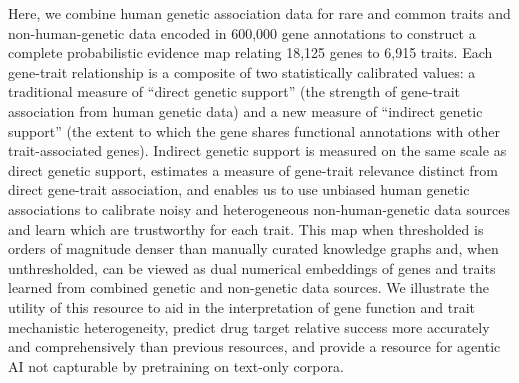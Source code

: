 Here, we combine human genetic association data for rare and common traits and non-human-genetic data encoded in 600,000 gene annotations to construct a complete probabilistic evidence map relating 18,125 genes to 6,915 traits. Each gene-trait relationship is a composite of two statistically calibrated values: a traditional measure of  ``direct genetic support'' (the strength of gene-trait association from human genetic data) and a new  measure of ``indirect genetic support'' (the extent to which the gene shares functional annotations with other trait-associated genes). Indirect genetic support is measured on the same scale as direct genetic support, estimates a measure of gene-trait relevance distinct from direct gene-trait association, and enables us to use unbiased human genetic associations to calibrate noisy and heterogeneous non-human-genetic data sources and learn which are trustworthy for each trait. This map when thresholded is orders of magnitude denser than manually curated knowledge graphs and, when unthresholded, can be viewed as dual numerical embeddings of genes and traits learned from combined genetic and non-genetic data sources. We illustrate the utility of this resource to aid in the interpretation of gene function and trait mechanistic heterogeneity, predict drug target relative success more accurately and comprehensively than previous resources, and provide a resource for agentic AI not capturable by pretraining on text-only corpora.


